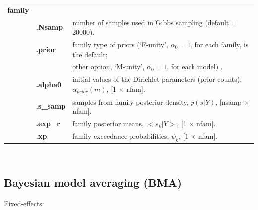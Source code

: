 \begin{tabular}{ l l l }
\bf{family}         & & \\
& \bf{.Nsamp}  & number of samples used in Gibbs sampling (default = 20000).\\
& \bf{.prior	}        & family type of priors (`F-unity', $\alpha_0=1$, for each family, is the default; \\
& & other option, `M-unity',  $\alpha_0=1$, for each model) .\\
& \bf{.alpha0}    & initial values of the Dirichlet parameters (prior counts), $\alpha_{prior}(m)$, [1 $\times$ nfam].\\
& \bf{.s\_samp}  & samples from family posterior density, $p(s|Y)$, [nsamp $\times$ nfam].\\
& \bf{.exp\_r}      & family posterior means, $<s_k|Y>$, [1 $\times$ nfam].\\
& \bf{.xp}	          & family exceedance probabilities, $\psi_k$, [1 $\times$ nfam].
\end{tabular}\\

\subsection{Bayesian model averaging (BMA)}

\hspace{4mm} Fixed-effects:\\

